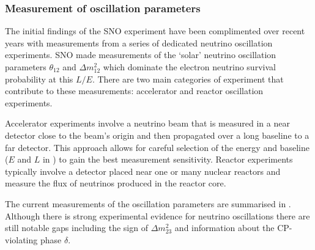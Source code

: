 \subsubsection{Measurement of oscillation parameters}
\label{section:particle-physics:neutrino-oscilltions:parameters}

The initial findings of the SNO experiment have been complimented over recent years with measurements from a series of dedicated neutrino oscillation experiments. SNO made measurements of the `solar' neutrino oscillation parameters $\theta_{12}$ and $\Delta m_{12}^{2}$ which dominate the electron neutrino survival probability at this $L/E$. There are two main categories of experiment that contribute to these measurements: accelerator and reactor oscillation experiments.

Accelerator experiments involve a neutrino beam that is measured in a near detector close to the beam's origin and then propagated over a long baseline to a far detector. This approach allows for careful selection of the energy and baseline ($E$ and $L$ in ) to gain the best measurement sensitivity. Reactor experiments typically involve a detector placed near one or many nuclear reactors and measure the flux of neutrinos produced in the reactor core.

The current measurements of the oscillation parameters are summarised in . Although there is strong experimental evidence for neutrino oscillations there are still notable gaps including the sign of $\Delta m^{2}_{23}$ and information about the CP-violating phase $\delta$.

